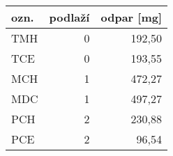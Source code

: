 \begin{tabular}{lrr}
\toprule
ozn. & podlaží& odpar [mg] \\
\midrule
TMH & 0 &192,50 \\
TCE & 0 &193,55 \\
MCH & 1 &472,27 \\
MDC & 1 &497,27 \\
PCH & 2 &230,88 \\
PCE & 2 & 96,54 \\
\bottomrule
\end{tabular}
